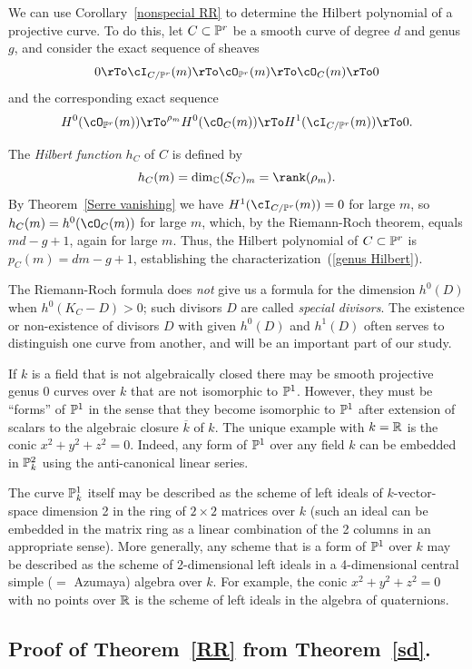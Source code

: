 We can  use Corollary~\ref{nonspecial RR} to determine the Hilbert polynomial of a projective curve. To do this, let $C \subset \PP^r$ be a smooth curve of degree $d$ and genus $g$, and consider the exact sequence of sheaves
$$
0 \rTo \cI_{C/\PP^r}(m) \rTo \cO_{\PP^r}(m) \rTo \cO_C(m) \rTo 0
$$
and the corresponding exact sequence
$$
 H^0(\cO_{\PP^r}(m)) \rTo^{\rho_m} H^0(\cO_C(m)) \rTo H^1(\cI_{C/\PP^r}(m)) \rTo 0.
$$

The \emph{Hilbert function} $h_C$ of $C$  is defined by
$$
h_C(m) = \dim_{\CC} (S_{C})_{m} = \rank(\rho_m).
$$
By Theorem~\ref{Serre vanishing} we have $H^1(\cI_{C/\PP^r}(m)) = 0$ for large $m$, so $h_{C}(m) = h^0(\cO_C(m))$ for large $m$, which, by the Riemann-Roch theorem, equals $md-g+1$, again for large $m$. Thus, the Hilbert polynomial of $C \subset \PP^r$ is $p_C(m) = dm-g+1$, establishing the characterization~(\ref{genus Hilbert}).
 
The Riemann-Roch formula does \emph{not} give us a formula for the dimension $h^0(D)$ when $h^0(K_C - D)>0$; such divisors $D$ are called \emph{special divisors}. The existence or non-existence of divisors $D$ with given $h^{0}(D)$ and $h^{1}(D)$ often serves to distinguish one curve from another, and will be an important part of our study.

\begin{fact}
If $k$ is a field that is not algebraically closed there may be smooth projective genus 0 curves over $k$ that are not isomorphic to $\PP^1$. However, they must be ``forms'' of $\PP^1$ in the sense that they become isomorphic to $\PP^1$ after extension of scalars to 
the algebraic closure $\overline k$ of $k$. The unique example with $k = \RR$ is the conic $x^2+y^2+z^2 = 0$. Indeed, any form of $\PP^1$ over any field $k$ can  be embedded in $\PP_{k}^2$  using the anti-canonical linear series.

The curve $\PP_k^1$ itself may be described as the scheme of left ideals of $k$-vector-space dimension 2 in the ring of
$2\times 2$ matrices over $k$ (such an ideal can be embedded in the matrix ring as a linear combination of the 2 columns in an appropriate sense). More generally, any scheme that is a form of $\PP^1$ over $k$
may be described as the scheme of 2-dimensional left ideals in a 4-dimensional central simple ($=$ Azumaya) algebra over $k$. For example, the
conic $x^2+y^2+z^2 = 0$ with no points over $\RR$ is the scheme of left ideals in the algebra of quaternions.\end{fact}

\subsection{Proof of Theorem~\ref{RR} from Theorem~\ref{sd}.}

